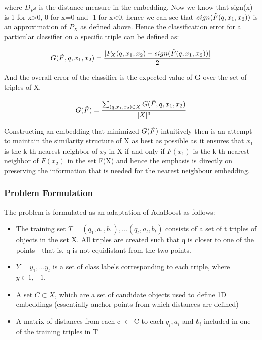 where $D_{R^d}$ is the distance measure in the embedding. Now we know that sign(x) is 1 for x>0, 0 for x=0 and -1 for x<0, hence we can see that $sign(\Tilde{F}(q,x_1,x_2))$ is an approximation of $P_X$ as defined above. Hence the classification error for a particular classifier on a specific triple can be defined as:

\begin{equation}
    G(\Tilde{F},q,x_1,x_2) = \frac{|P_X(q,x_1,x_2) - sign(\Tilde{F}(q,x_1,x_2))|}{2}
\end{equation}

And the overall error of the classifier is the expected value of G over the set of triples of X.

\begin{equation}
    G(\Tilde{F}) = \frac{\sum_{(q,x_1,x_2) \in X}G(\Tilde{F},q,x_1,x_2)}{|X|^3}
\end{equation}

Constructing an embedding that minimized $G(\Tilde{F})$ intuitively then is an attempt to maintain the similarity structure of X as best as possible as it ensures that $x_1$ is the k-th
nearest neighbor of $x_2$ in X if and only if $F(x_1)$ is the k-th nearest neighbor of $F(x_2)$ in the set F(X) and hence the emphasis is directly on preserving the information that is needed for the nearest neighbour embedding.

\subsubsection{Problem Formulation}
The problem is formulated as an adaptation of AdaBoost as follows:

\begin{itemize}
  \item The training set $T = {(q_1,a_1,b_1),...(q_t,a_t,b_t)}$ consists of a set of t triples of objects in the set X. All triples are created such that q is closer to one of the points - that is, q is not equidistant from the two points. 
  \item $Y={y_1,...y_t}$ is a set of class labels corresponding to each triple, where $y \in {1,-1}$. 
  \item A set $C \subset X$, which are a set of candidate objects used to define 1D embeddings (essentially anchor points from which distances are defined)
  \item A matrix of distances from each c $\in$ C to each $q_i, a_i$ and $b_i$ included in one of the training triples in T
\end{itemize}


